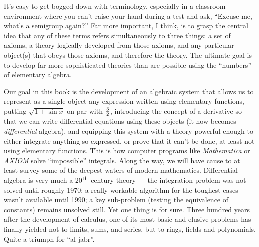 It's easy to get bogged down with terminology, especially in a
classroom environment where you can't raise your hand during a test
and ask, ``Excuse me, what's a semigroup again?''  Far more important,
I think, is to grasp the central idea that any of these terms refers
simultaneously to three things: a set of axioms, a theory logically
developed from those axioms, and any particular object(s) that obeys
those axioms, and therefore the theory.  The ultimate goal is to
develop far more sophisticated theories than are possible using the
``numbers'' of elementary algebra.

Our goal in this book is the development of an algebraic system that
allows us to represent as a single object any expression written using
elementary functions, putting $\sqrt{1 + \sin x}$ on par with
$3\over2$, introducing the concept of a derivative so that we can
write differential equations using these objects (it now becomes {\it
differential} algebra), and equipping this system with a theory
powerful enough to either integrate anything so expressed, or prove
that it can't be done, at least not using elementary functions.  This
is how computer programs like {\it Mathematica} or {\it AXIOM} solve
``impossible'' integrals.  Along the way, we will have cause to
at least survey some of the deepest waters of modern
mathematics.  Differential algebra is very much a 20$^{\rm th}$
century theory --- the integration problem was not solved until
roughly 1970; a really workable algorithm for the toughest cases
wasn't available until 1990; a key sub-problem (testing the
equivalence of constants) remains unsolved still.  Yet one thing is
for sure.  Three hundred years after the development of calculus, one
of its most basic and elusive problems has finally yielded not to
limits, sums, and series, but to rings, fields and polynomials.  Quite a
triumph for ``al-jabr''.
